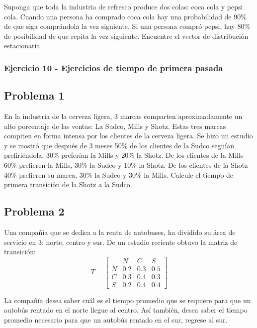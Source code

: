 \documentclass{article}
\begin{document}
Suponga que toda la industria de refresco produce dos colas: coca cola y pepsi cola. Cuando una persona ha comprado coca cola hay una probabilidad de 90\% de que siga comprándola la vez siguiente. Si una persona compró pepsi, hay 80\% de posibilidad de que repita la vez siguiente. Encuentre el vector de distribución estacionaria.


\subsubsection{Ejercicio 10 - Ejercicios de tiempo de primera pasada}

\subsection*{Problema 1}
En la industria de la cerveza ligera, 3 marcas comparten aproximadamente un alto porcentaje de las ventas: La Sudco, Mills y Shotz. Estas tres marcas compiten en forma intensa por los clientes de la cerveza ligera. Se hizo un estudio y se mostró que después de 3 meses 50\% de los clientes de la Sudco seguían prefiriéndola, 30\% preferían la Mills y 20\% la Shotz. De los clientes de la Mills 60\% prefieren la Mills, 30\% la Sudco y 10\% la Shotz. De los clientes de la Shotz 40\% prefieren su marca, 30\% la Sudco y 30\% la Mills. Calcule el tiempo de primera transición de la Shotz a la Sudco.

\subsection*{Problema 2}
Una compañía que se dedica a la renta de autobuses, ha dividido su área de servicio en 3: norte, centro y sur. De un estudio reciente obtuvo la matriz de transición:
\[
    T=
    \begin{bmatrix}
          & N   & C   & S   \\
        N & 0.2 & 0.3 & 0.5 \\
        C & 0.3 & 0.4 & 0.3 \\
        S & 0.2 & 0.4 & 0.4
    \end{bmatrix}
\]

La compañía desea saber cuál es el tiempo promedio que se requiere para que un autobús rentado en el norte llegue al centro. Así también, desea saber el tiempo promedio necesario para que un autobús rentado en el sur, regrese al sur.
\end{document}
